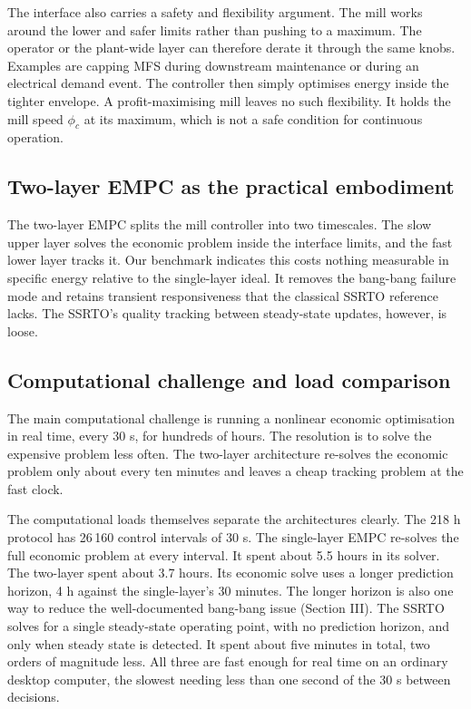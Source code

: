 \documentclass[conference]{IEEEtran}
\begin{document}
The interface also carries a safety and flexibility argument. The mill
works around the lower and safer limits rather than pushing to a
maximum. The operator or the plant-wide layer can therefore derate it
through the same knobs. Examples are capping MFS during downstream
maintenance or during an electrical demand event. The controller then
simply optimises energy inside the tighter envelope.
A profit-maximising mill leaves no such
flexibility. It holds the mill speed $\phi_c$ at its maximum, which is
not a safe condition for continuous operation.

\subsection{Two-layer EMPC as the practical embodiment}

The two-layer EMPC splits the mill controller into two timescales. The
slow upper layer solves the economic problem inside the interface
limits, and the fast lower layer tracks it. Our benchmark indicates
this costs nothing measurable in specific energy relative to the
single-layer ideal. It removes the bang-bang failure mode and retains
transient responsiveness that the classical SSRTO reference lacks. The
SSRTO's quality tracking between steady-state updates, however, is
loose.

\subsection{Computational challenge and load comparison}

The main computational challenge is running a nonlinear economic
optimisation in real time, every 30 s, for hundreds of hours. The
resolution is to solve the expensive problem less often. The two-layer
architecture re-solves the economic problem only about every ten
minutes and leaves a cheap tracking problem at the fast clock.

The computational loads themselves separate the architectures clearly.
The 218 h protocol has 26\,160 control intervals of 30 s. The
single-layer EMPC re-solves the full economic problem at every
interval. It spent about 5.5 hours in its solver.
The two-layer spent about 3.7 hours. Its economic solve uses a longer
prediction horizon, 4 h against the
single-layer's 30 minutes. The longer horizon is also one way to
reduce the well-documented bang-bang issue
\cite{thivierge2023,ellis2017} (Section III). The SSRTO solves for a
single steady-state operating point, with no prediction horizon, and
only when steady state is detected. It
spent about five minutes in total, two orders of magnitude less. All
three are fast enough for real time on an ordinary desktop computer,
the slowest needing less than one second of the 30 s between
decisions.
\end{document}
